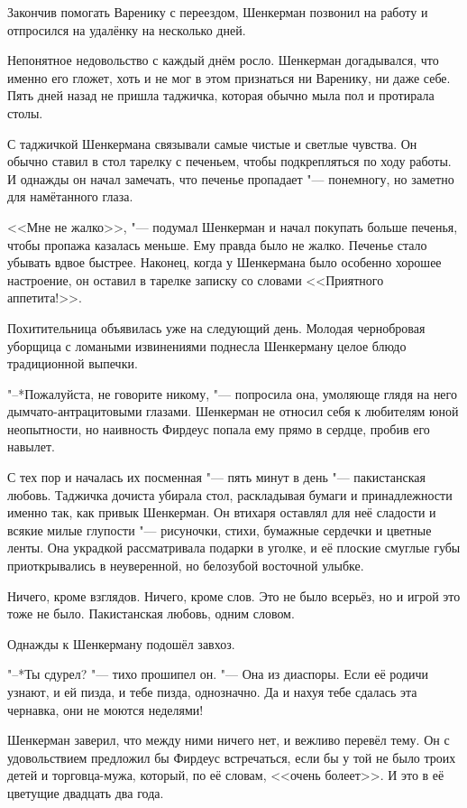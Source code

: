 \asterism

Закончив помогать Варенику с переездом, Шенкерман позвонил на работу и отпросился на удалёнку на несколько дней.

Непонятное недовольство с каждый днём росло.
Шенкерман догадывался, что именно его гложет, хоть и не мог в этом признаться ни Варенику, ни даже себе.
Пять дней назад не пришла таджичка, которая обычно мыла пол и протирала столы.

С таджичкой Шенкермана связывали самые чистые и светлые чувства.
Он обычно ставил в стол тарелку с печеньем, чтобы подкрепляться по ходу работы.
И однажды он начал замечать, что печенье пропадает "--- понемногу, но заметно для намётанного глаза.

<<Мне не жалко>>, "--- подумал Шенкерман и начал покупать больше печенья, чтобы пропажа казалась меньше.
Ему правда было не жалко.
Печенье стало убывать вдвое быстрее.
Наконец, когда у Шенкермана было особенно хорошее настроение, он оставил в тарелке записку со словами <<Приятного аппетита!>>.

Похитительница объявилась уже на следующий день.
Молодая чернобровая уборщица с ломаными извинениями поднесла Шенкерману целое блюдо традиционной выпечки.

"--*Пожалуйста, не говорите никому, "--- попросила она, умоляюще глядя на него дымчато-антрацитовыми глазами.
Шенкерман не относил себя к любителям юной неопытности, но наивность Фирдеус попала ему прямо в сердце, пробив его навылет.

С тех пор и началась их посменная "--- пять минут в день "--- пакистанская любовь.
Таджичка дочиста убирала стол, раскладывая бумаги и принадлежности именно так, как привык Шенкерман.
Он втихаря оставлял для неё сладости и всякие милые глупости "--- рисуночки, стихи, бумажные сердечки и цветные ленты.
Она украдкой рассматривала подарки в уголке, и её плоские смуглые губы приоткрывались в неуверенной, но белозубой восточной улыбке.

Ничего, кроме взглядов.
Ничего, кроме слов.
Это не было всерьёз, но и игрой это тоже не было.
Пакистанская любовь, одним словом.

Однажды к Шенкерману подошёл завхоз.

"--*Ты сдурел? "--- тихо прошипел он.
"--- Она из диаспоры.
Если её родичи узнают, и ей пизда, и тебе пизда, однозначно.
Да и нахуя тебе сдалась эта чернавка, они не моются неделями!

Шенкерман заверил, что между ними ничего нет, и вежливо перевёл тему.
Он с удовольствием предложил бы Фирдеус встречаться, если бы у той не было троих детей и торговца-мужа, который, по её словам, <<очень болеет>>.
И это в её цветущие двадцать два года.

